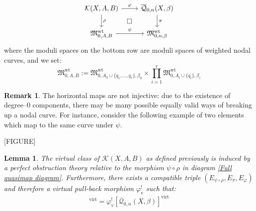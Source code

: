 \documentclass[11pt]{amsart}
\newcommand{\Q}[4]{\overline{\mathcal Q}_{#1,#2}(#3,#4)}
\newcommand{\MM}{\mathfrak M}
\newcommand{\virt}[1]{[#1]^{\operatorname{virt}}}
\theoremstyle{plain}
\newtheorem{lemma}[thm]{Lemma}
\theoremstyle{definition}
\newtheorem{remark}[thm]{Remark}
\begin{document}
\begin{equation} \label{Full quasimap diagram}
\begin{tikzcd}
\mathcal{K}(X,A,B) \ar[r,"\varphi"] \ar[d,"\rho"] \ar[rd,phantom,"\square"] & \Q{0}{n}{X}{\beta} \ar[d,"\pi"] \\
\MM_{0,A,B}^{\operatorname{wt}} \ar[r,"\psi"] & \MM_{0,n,\beta}^{\operatorname{wt}}
\end{tikzcd}
\end{equation}
where the moduli spaces on the bottom row are moduli spaces of weighted nodal curves, and we set:
\begin{equation*} \MM_{0,A,B}^{\operatorname{wt}} := \MM_{0,A_0\cup\{q_1,\ldots,q_r\},\beta_0}^{\operatorname{wt}} \times \prod_{i=1}^r \MM_{0,A_i\cup\{q_i\},\beta_i}^{\operatorname{wt}} \end{equation*}

\begin{remark} The horizontal maps are not injective: due to the existence of degree--$0$ components, there may be many possible equally valid ways of breaking up a nodal curve. For instance, consider the following example of two elements which map to the same curve under $\psi$.

[FIGURE]
\end{remark}

\begin{lemma} \label{Lemma product class equals pullback class} The virtual class of $\mathcal{K}(X,A,B)$ as defined previously is induced by a perfect obstruction theory relative to the morphism $\psi \circ \rho$ in diagram \eqref{Full quasimap diagram}. Furthermore, there exists a compatible triple $(E_{\psi \circ \rho}, E_{\pi}, E_{\varphi})$ and therefore a virtual pull-back morphism $\varphi_{\text{v}}^!$ such that:
\begin{equation*} \virt{\mathcal{K}(X,A,B)} = \varphi_{\text{v}}^! \virt{\Q{0}{n}{X}{\beta}} \end{equation*} \end{lemma}
\end{document}
